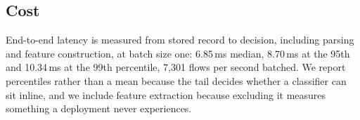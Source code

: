 \subsection{Cost}



End-to-end latency is measured from stored record to decision, including
parsing and feature construction, at batch size one: 6.85\,ms median, 8.70\,ms
at the 95th and 10.34\,ms at the 99th percentile, 7{,}301 flows per second
batched. We report percentiles
rather than a mean because the tail decides whether a classifier can sit
inline, and we include feature extraction because excluding it measures
something a deployment never experiences.
